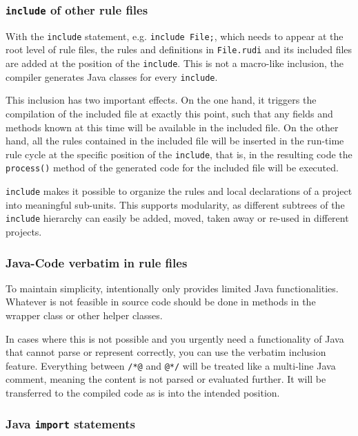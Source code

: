 \subsubsection{\texttt{include} of other rule files}

With the \texttt{include} statement, e.g. \texttt{include File;},
which needs to appear at the root level of rule files, the rules and
definitions in \texttt{File.rudi} and its included files are added at
the position of the \texttt{include}. This is not a macro-like
inclusion, the compiler generates Java classes for every
\texttt{include}.

This inclusion has two important effects. On the one hand, it triggers
the compilation of the included file at exactly this point, such that
any fields and methods known at this time will be available in the
included file. On the other hand, all the rules contained in the
included file will be inserted in the run-time rule cycle at the
specific position of the \texttt{include}, that is, in the resulting
code the \texttt{process()} method of the generated code for the
included file will be executed.

\texttt{include} makes it possible to organize the rules and local
declarations of a project into meaningful sub-units. This supports
modularity, as different subtrees of the \texttt{include} hierarchy can
easily be added, moved, taken away or re-used in different projects.

\subsubsection{Java-Code verbatim in rule files} \label{sec:rudi-verbatim}

To maintain simplicity, \vonda intentionally only provides limited Java
functionalities. Whatever is not feasible in \vonda source code should be done
in methods in the wrapper class or other helper classes.

In cases where this is not possible and you urgently need a functionality of
Java that \vonda cannot parse or represent correctly, you can use the verbatim
inclusion feature. Everything between \verb|/*@| and \verb|@*/| will be treated
like a multi-line Java comment, meaning the content is not parsed or evaluated
further. It will be transferred to the compiled code as is into the intended
position.

\subsubsection{Java \texttt{import}
  statements} \label{sec:java-import}

